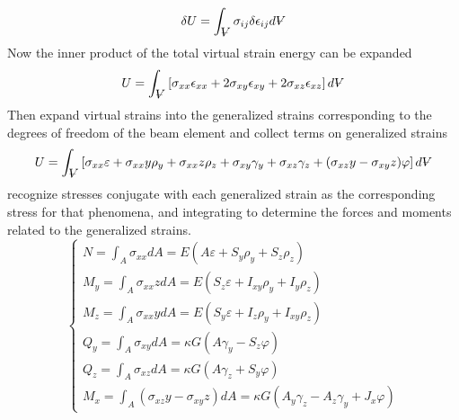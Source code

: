 \begin{equation}\label{eq:TotalVirtualStrainEnergyExpression}
\delta U = \int_{\volume}\sigma_{ij}\delta\epsilon_{ij}d\volume
\end{equation}
Now the inner product of the total virtual strain energy can be expanded
\begin{equation}\label{eq:TotalStrainEnergyExpanded}
U=\int_{\volume}\left[\sigma_{xx}\epsilon_{xx}+2\sigma_{xy}\epsilon_{xy}+2\sigma_{xz}\epsilon_{xz}\right]d\volume
\end{equation}
Then expand virtual strains into the generalized strains corresponding to the degrees of freedom of the beam element and collect terms on generalized strains
\begin{equation}\label{eq:TotalStrainEnergyGeneralized}
 U=\int_{\volume}\left[\sigma_{xx}\varepsilon+\sigma_{xx}y\rho_y+\sigma_{xx}z\rho_z+\sigma_{xy}\gamma_y+\sigma_{xz}\gamma_z+(\sigma_{xz}y-\sigma_{xy}z)\varphi\right]d\volume
\end{equation}
recognize stresses conjugate with each generalized strain as the corresponding stress for that phenomena, and integrating to determine the forces and moments related to the generalized strains.
\begin{equation}\label{eq:generalizedForces}
\left\{\begin{array}{l}
N=\int_A\sigma_{xx}dA=E( A\varepsilon+S_y\rho_y+S_z\rho_z)\\
M_y=\int_A\sigma_{xx}zdA=E(S_z\varepsilon+I_{xy}\rho_y+I_y\rho_z)\\
M_z=\int_A\sigma_{xx}ydA=E(S_y\varepsilon+I_z\rho_y+I_{xy}\rho_z)\\
Q_y=\int_A\sigma_{xy}dA=\kappa G(A\gamma_y-S_z\varphi)\\
Q_z=\int_A\sigma_{xz}dA=\kappa G(A\gamma_z+S_y\varphi)\\
M_x=\int_A(\sigma_{xz}y-\sigma_{xy}z)dA=\kappa G\left(A_y\gamma_z-A_z\gamma_y+J_x\varphi\right)
\end{array}\right.
\end{equation}
